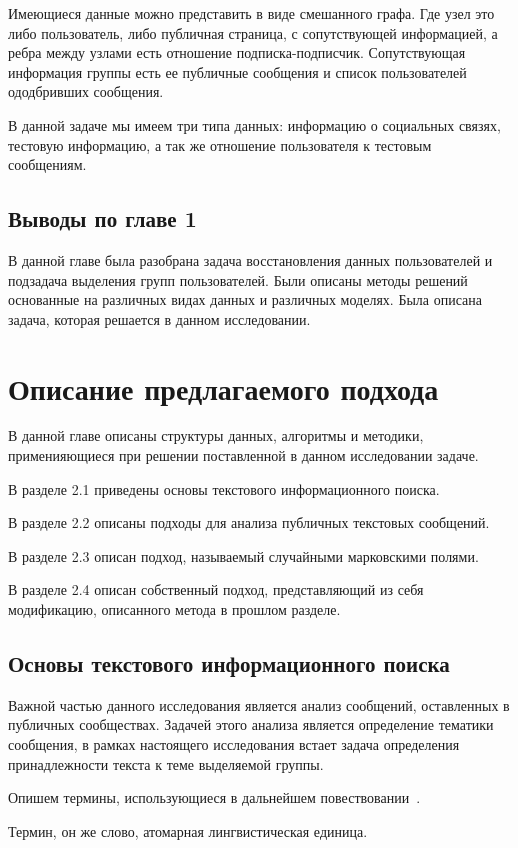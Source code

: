 \documentclass[annotation,times,page4]{itmo-student-thesis}
\begin{document}
Имеющиеся данные можно представить в виде смешанного графа. Где узел это либо пользователь, либо публичная страница, с сопутствующей информацией, а ребра между узлами есть отношение подписка-подписчик. Сопутствующая информация группы есть ее публичные сообщения и список пользователей ододбривших сообщения. 

В данной задаче мы имеем три типа данных: информацию о социальных связях, тестовую информацию, а так же отношение пользователя к тестовым сообщениям. 

\section{Выводы по главе 1}
В данной главе была разобрана задача восстановления данных пользователей и подзадача выделения групп пользователей. Были описаны методы решений основанные на различных видах данных и различных моделях. Была описана задача, которая решается в данном исследовании.

\chapter{Описание предлагаемого подхода}
В данной главе описаны структуры данных, алгоритмы и методики, применияющиеся при решении поставленной в данном исследовании задаче.

В разделе 2.1 приведены основы текстового информационного поиска.

В разделе 2.2 описаны подходы для анализа публичных текстовых сообщений.

В разделе 2.3 описан подход, называемый случайными марковскими полями.

В разделе 2.4 описан собственный подход, представляющий из себя модификацию, описанного метода в прошлом разделе. 
\section{Основы текстового информационного поиска}
Важной частью данного исследования является анализ сообщений, оставленных в публичных сообществах. Задачей этого анализа является определение тематики сообщения, в рамках настоящего исследования встает задача определения принадлежности текста к теме выделяемой группы. 

Опишем термины, использующиеся в дальнейшем повествовании~\cite{manning2008introduction}.  

Термин, он же слово, атомарная лингвистическая единица.
\end{document}
